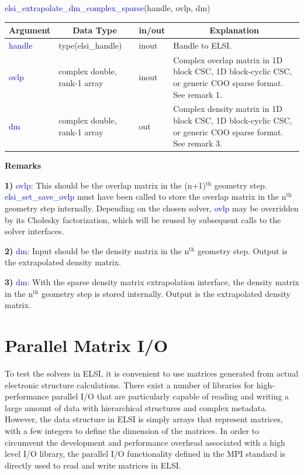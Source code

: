 \documentclass{report}
\begin{document}
\begin{labeling}{\hspace{6cm}}
\item [\hspace{0.3cm} \textcolor{blue}{elsi\_extrapolate\_dm\_complex\_sparse}(handle, ovlp, dm)]
\end{labeling}

\begin{tabular}[]{|p{20mm}|p{45mm}|p{15mm}|p{85mm}|}
\hline
\multicolumn{1}{|c|}{\textbf{Argument}} & \multicolumn{1}{c|}{\textbf{Data Type}} & \multicolumn{1}{c|}{\textbf{in/out}} & \multicolumn{1}{c|}{\textbf{Explanation}}\\
\hline
\textcolor{blue}{handle} & type(elsi\_handle)           & inout & Handle to ELSI.\\
\hline
\textcolor{blue}{ovlp}   & complex double, rank-1 array & inout & Complex overlap matrix in 1D block CSC, 1D block-cyclic CSC, or generic COO sparse format. See remark 1.\\
\hline
\textcolor{blue}{dm}     & complex double, rank-1 array & out   & Complex density matrix in 1D block CSC, 1D block-cyclic CSC, or generic COO sparse format. See remark 3.\\
\hline
\end{tabular}

\textbf{Remarks}

\textbf{1)} \textcolor{blue}{ovlp}: This should be the overlap matrix in the (n+1)$^\text{th}$ geometry step. \textcolor{blue}{elsi\_set\_save\_ovlp} must have been called to store the overlap matrix in the n$^\text{th}$ geometry step internally. Depending on the chosen solver, \textcolor{blue}{ovlp} may be overridden by its Cholesky factorization, which will be reused by subsequent calls to the solver interfaces.

\textbf{2)} \textcolor{blue}{dm}: Input should be the density matrix in the n$^\text{th}$ geometry step. Output is the extrapolated density matrix.

\textbf{3)} \textcolor{blue}{dm}: With the sparse density matrix extrapolation interface, the density matrix in the n$^\text{th}$ geometry step is stored internally. Output is the extrapolated density matrix.

\section{Parallel Matrix I/O}
\label{sec:rw}
To test the solvers in ELSI, it is convenient to use matrices generated from actual electronic structure calculations. There exist a number of libraries for high-performance parallel I/O that are particularly capable of reading and writing a large amount of data with hierarchical structures and complex metadata. However, the data structure in ELSI is simply arrays that represent matrices, with a few integers to define the dimension of the matrices. In order to circumvent the development and performance overhead associated with a high level I/O library, the parallel I/O functionality defined in the MPI standard is directly used to read and write matrices in ELSI.
\end{document}
